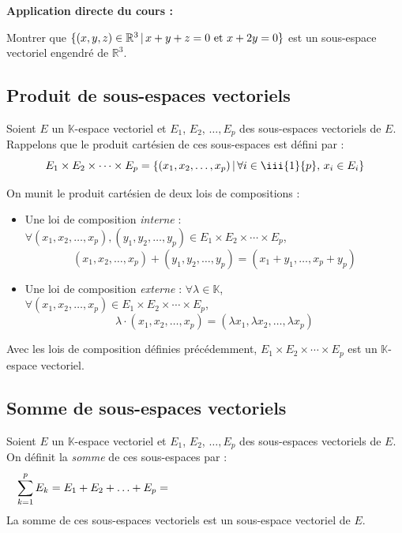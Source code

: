 \documentclass[french,11pt,twoside]{VcCours}
\newenvironment{ApplicationDirecte}{\textbf{Application directe du cours :}

}{}
\begin{document}
\begin{ApplicationDirecte} Montrer que $\lbrace (x,y,z)  \in \mathbb{R}^3 \, \vert \, x+y+z=0 \hbox{ et } x+2y=0\rbrace$ est un sous-espace vectoriel engendré de $\mathbb{R}^3$.
\end{ApplicationDirecte}

\subsection{Produit de sous-espaces vectoriels}

Soient $E$ un $\mathbb{K}$-espace vectoriel et $E_1$, $E_2$, $\ldots, E_p$ des sous-espaces vectoriels de $E$. Rappelons que le produit cartésien de ces sous-espaces est défini par :
$$ E_1 \times E_2 \times \cdots \times E_p = \left\lbrace (x_1, x_2, \ldots, x_p) \, \vert \, \forall i \in \iii{1}{p}, \, x_i \in E_i \right\rbrace$$

On munit le produit cartésien de deux lois de compositions :

\begin{itemize}
\item Une loi de composition \emph{interne} : $\forall (x_1, x_2, \ldots, x_p), (y_1, y_2, \ldots, y_p) \in E_1 \times E_2 \times \cdots \times E_p$,
$$ (x_1, x_2, \ldots, x_p) + (y_1, y_2, \ldots, y_p) = (x_1+y_1, \ldots, x_p + y_p)$$
\item Une loi de composition \emph{externe} : $\forall \lambda \in \mathbb{K}$, $\forall (x_1, x_2, \ldots, x_p) \in E_1 \times E_2 \times \cdots \times E_p$,
$$ \lambda \cdot (x_1, x_2, \ldots, x_p) = (\lambda x_1, \lambda x_2, \ldots, \lambda x_p)$$
\end{itemize}

\begin{Proposition}{}
Avec les lois de composition définies précédemment, $E_1 \times E_2 \times \cdots \times E_p$ est un $\mathbb{K}$-espace vectoriel.
\end{Proposition}







\subsection{Somme de sous-espaces vectoriels}

\begin{TheoremeDefinition}{}
Soient $E$ un $\mathbb{K}$-espace vectoriel et $E_1$, $E_2$, $\ldots, E_p$ des sous-espaces vectoriels de $E$. On définit la \emph{somme} de ces sous-espaces par :
$$ \sum_{k=1}^p E_k = E_1 + E_2 + \ldots + E_p = \phantom{\left\lbrace \sum_{k=1}^p x_k \, \big{\vert} \, (x_1, x_2, \ldots, x_p) \in E_1 \times E_2 \times \cdots E_p \right\rbrace}$$
La somme de ces sous-espaces vectoriels est un sous-espace vectoriel de $E$.
\end{TheoremeDefinition}
\end{document}
